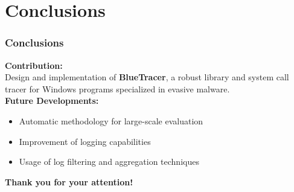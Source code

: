 \documentclass[compress]{beamer}
\begin{document}
\begin{frame}[fragile]


\end{frame}

\section{Conclusions}

\begin{frame}
    \frametitle{Conclusions}
	
	\textbf{\textcolor{sapienza}{Contribution:}} \\
	\smallskip	
	\tab Design and implementation of \textbf{BlueTracer},
a robust library and system call tracer for Windows programs specialized in evasive
malware.
	\\\bigskip
	\textbf{\textcolor{sapienza}{Future Developments:}} \\
	\begin{itemize}
	\item Automatic methodology for large-scale evaluation 
	\item Improvement of logging capabilities
	\item Usage of log filtering and aggregation techniques
	\end{itemize}

\end{frame}

\begin{frame}
\begin{center}
{\fontsize{15}{15}\selectfont \textbf{Thank you for your attention!}}
\end{center}
\end{frame}
\end{document}
